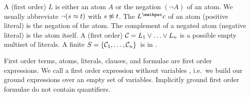 
\begin{definition}\label{def:literals}\label{def:syntax:CNF}
A (first order)  \( L \) is either an atom \( A \) or the negation
\( (\lnot A) \) of an atom. We usually abbreviate \( \lnot(s\approx t) \) with \( s\not\approx t \).
%
The  \( L^\mcc \) of an atom (positive literal) is the negation of the atom.
The complement of a negated atom (negative literal) is the atom itself.
A (first order)  \( \mathcal{C} = L_1\lor\ldots\lor L_n \)  is a possible empty multiset of literals.
A finite  \( S=\{ \mathcal{C}_1,\ldots,\mathcal{C}_n \} \) is in .
\end{definition}

\begin{remark}
	First order terms, atoms, literals, clauses, and formulae are first order expressions.
	We call a first order expression without variables ,
	i.e.~we build our ground expressions over an empty set of variables.
	Implicitly ground first order formulae do not contain quantifiers.
\end{remark}



